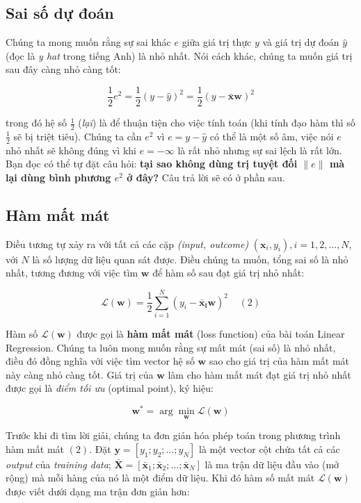  
 
\subsection{Sai số dự đoán }
 
Chúng ta mong muốn rằng sự sai khác $e$ giữa giá trị thực $y$ và giá trị dự đoán $\hat{y}$ (đọc là \textit{y hat} trong tiếng Anh) là nhỏ nhất. Nói cách khác, chúng ta muốn giá trị sau đây càng nhỏ càng tốt:  
 
$$ 
\frac{1}{2}e^2 = \frac{1}{2}(y - \hat{y})^2 = \frac{1}{2}(y - \mathbf{\bar{x}}\mathbf{w})^2 
$$ 
 
trong đó hệ số $\frac{1}{2} $ (\textit{lại}) là để thuận tiện cho việc tính toán (khi tính đạo hàm thì số $\frac{1}{2} $ sẽ bị triệt tiêu). Chúng ta cần $e^2$ vì $e = y - \hat{y} $ có thể là một số âm, việc nói $e$ nhỏ nhất sẽ không đúng vì khi $e = - \infty$ là rất nhỏ nhưng sự sai lệch là rất lớn. Bạn đọc có thể tự đặt câu hỏi: \textbf{tại sao không dùng trị tuyệt đối $ \|e\| $ mà lại dùng bình phương $e^2$ ở đây?} Câu trả lời sẽ có ở phần sau.  
 
 
 
 
 
 
\subsection{Hàm mất mát}
 
Điều tương tự xảy ra với tất cả các cặp \textit{(input, outcome)} $ (\mathbf{x}_i, y_i), i = 1, 2, \dots, N $, với $N$ là số lượng dữ liệu quan sát được. Điều chúng ta muốn, tổng sai số là nhỏ nhất, tương đương với việc tìm $ \mathbf{w} $ để hàm số sau đạt giá trị nhỏ nhất: 
 
$$ \mathcal{L}(\mathbf{w}) = \frac{1}{2}\sum_{i=1}^N (y_i - \mathbf{\bar{x}_i}\mathbf{w})^2 ~~~~~(2) $$  
 
Hàm số $\mathcal{L}(\mathbf{w}) $ được gọi là \textbf{hàm mất mát} (loss function) của bài toán Linear Regression. Chúng ta luôn mong muốn rằng sự mất mát (sai số) là nhỏ nhất, điều đó đồng nghĩa với việc  tìm vector hệ số $ \mathbf{w} $  sao cho  
giá trị của hàm mất mát này càng nhỏ càng tốt. Giá trị của $\mathbf{w}$ làm cho hàm mất mát đạt giá trị nhỏ nhất được gọi là \textit{điểm tối ưu} (optimal point), ký hiệu: 
 
$$ \mathbf{w}^* = \arg\min_{\mathbf{w}} \mathcal{L}(\mathbf{w})  $$  
 
Trước khi đi tìm lời giải, chúng ta đơn giản hóa phép toán trong phương trình hàm mất mát $(2)$. Đặt $\mathbf{y} = [y_1; y_2; \dots; y_N]$ là một vector cột chứa tất cả các \textit{output} của \textit{training data}; $ \mathbf{\bar{X}} = [\mathbf{\bar{x}}_1; \mathbf{\bar{x}}_2; \dots; \mathbf{\bar{x}}_N ] $ là ma trận dữ liệu đầu vào (mở rộng) mà mỗi hàng của nó là một điểm dữ liệu. Khi đó hàm số mất mát $\mathcal{L}(\mathbf{w})$ được viết dưới dạng ma trận đơn giản hơn: 
 
